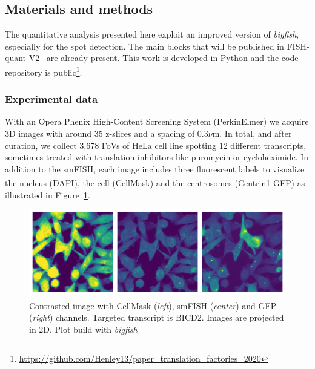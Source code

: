 

\subsection{Materials and methods}
\label{subsec:materials_centrosomal}

The quantitative analysis presented here exploit an improved version of \emph{bigfish}, especially for the spot detection.
The main blocks that will be published in FISH-quant V2~\cite{Imbert_fq_2022} are already present.
This work is developed in Python and the code repository is public\footnote{\url{https://github.com/Henley13/paper_translation_factories_2020}}.

\subsubsection{Experimental data}

With an Opera Phenix High-Content Screening System (PerkinElmer) we acquire 3D images with around 35 z-slices and a spacing of 0.3$\nu$m.
In total, and after curation, we collect 3,678 \ac{FoV}s of HeLa cell line spotting 12 different transcripts, sometimes treated with translation inhibitors like puromycin or cycloheximide.
In addition to the \ac{smFISH}, each image includes three fluorescent labels to visualize the nucleus (DAPI), the cell (CellMask\textsuperscript{\texttrademark}) and the centrosomes (Centrin1-\ac{GFP}) as illustrated in Figure~\ref{fig:fov_adham}.

\begin{figure}[]
    \centering
    \includegraphics[width=\textwidth]{figures/chapter5/FoV_BICD2}
    \caption{Contrasted image with CellMask\textsuperscript{\texttrademark} (\textit{left}), smFISH (\textit{center}) and GFP (\textit{right}) channels.
	Targeted transcript is BICD2.
	Images are projected in 2D.
	Plot build with \emph{bigfish}}
    \label{fig:fov_adham}
\end{figure}

